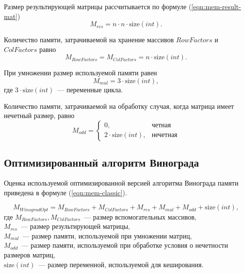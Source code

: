 Размер результирующей матрицы рассчитывается по формуле (\ref{eqn:mem-result-mat})
\begin{equation}
    \label{eqn:mem-result-mat}
    M_{res} = n \cdot n \cdot \text{size}(int).
\end{equation}

Количество памяти, затрачиваемой на хранение массивов $RowFactors$ и $ColFactors$ равно
\begin{equation}
    M_{RowFactors} = M_{ColFactors} = n \cdot \text{size}(int).
\end{equation}

При умножении размер используемой памяти равен
\begin{equation}
    M_{mul} = 3 \cdot \text{size}(int),
\end{equation}
где $3 \cdot \text{size}(int)$~--- переменные цикла.


Количество памяти, затрачиваемой на обработку случая, когда матрица имеет нечетный размер, равно
\begin{equation}
    \label{eqn:mem-winograd-odd}
    M_{odd} = 
    \begin{cases}
        0, & \text{четная}\\
        2 \cdot \text{size}(int), & \text{нечетная}
    \end{cases}
\end{equation}

\subsection{Оптимизированный алгоритм Винограда}

Оценка используемой оптимизированной версией алгоритма Винограда памяти приведена в формуле (\ref{eqn:mem-classic}).

\begin{equation}
    M_{WinogradOpt} = M_{RowFactors} + M_{ColFactors} + M_{res} + M_{mul} + M_{odd} + \text{size}(int),
\end{equation}
где $M_{RowFactors}, M_{ColFactors}$~--- размер вспомогательных массивов,
\\ $M_{res}$~--- размер результирующей матрицы,
\\ $M_{mul}$~--- размер памяти, используемой при умножении матриц,
\\ $M_{odd}$~--- размер памяти, используемой при обработке условия о нечетности размеров матриц,
\\ $\text{size}(int)$~--- размер переменной, используемой для кеширования.

